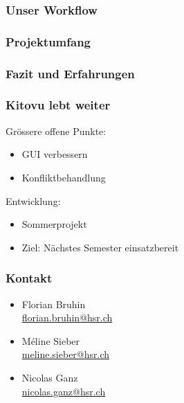 \documentclass{beamer}
\begin{document}
  \begin{frame}
    \frametitle{Unser Workflow}
  \end{frame}

  \begin{frame}
    \frametitle{Projektumfang}
  \end{frame}

  \begin{frame}
    \frametitle{Fazit und Erfahrungen}
  \end{frame}

  \begin{frame}
    \frametitle{Kitovu lebt weiter}

    Grössere offene Punkte:
    \begin{itemize}
      \item GUI verbessern
      \item Konfliktbehandlung
    \end{itemize}

    Entwicklung:
    \begin{itemize}
      \item Sommerprojekt
      \item Ziel: Nächstes Semester einsatzbereit
    \end{itemize}
  \end{frame}

  \begin{frame}
    \frametitle{Kontakt}
    \begin{itemize}
      \item Florian Bruhin \\ \url{florian.bruhin@hsr.ch} \\[2em]
      \item Méline Sieber \\ \url{meline.sieber@hsr.ch} \\[2em]
      \item Nicolas Ganz \\ \url{nicolas.ganz@hsr.ch}
    \end{itemize}
  \end{frame}
\end{document}

